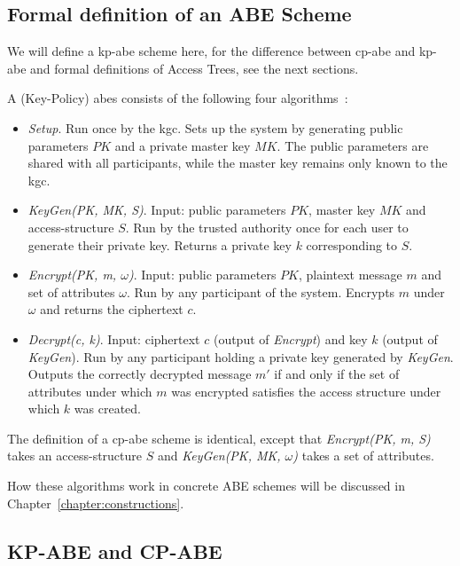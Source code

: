 \subsection{Formal definition of an ABE Scheme}\label{sec:definition-es}

We will define a \acrshort{kp-abe} scheme here, for the difference between \acrshort{cp-abe} and \acrshort{kp-abe} and formal definitions of Access Trees, see the next sections.

\begin{definition}
    A (Key-Policy) \Acrlong{abes} consists of the following four algorithms~\cite{goyal_attribute-based_2006}:
    \begin{itemize}
        \item \emph{Setup}. Run once by the \acrfull{kgc}. Sets up the system by generating public parameters $PK$ and a private master key $MK$. The public parameters are shared with all participants, while the master key remains only known to the \acrshort{kgc}.
        \item \emph{KeyGen(PK, MK, S)}. Input: public parameters $PK$, master key $MK$ and \gls{access-structure} $S$.
        Run by the trusted authority once for each user to generate their private key. Returns a private key $k$ corresponding to $S$.
        \item \emph{Encrypt(PK, m, $\omega$)}. Input: public parameters $PK$, plaintext message $m$ and set of attributes $\omega$.
        Run by any participant of the system. Encrypts $m$ under $\omega$ and returns the ciphertext $c$.
        \item \emph{Decrypt(c, k)}. Input: ciphertext $c$ (output of \emph{Encrypt}) and key $k$ (output of \emph{KeyGen}).
        Run by any participant holding a private key generated by \emph{KeyGen}. Outputs the correctly decrypted message $m'$ if and only if the set of attributes under which $m$ was encrypted satisfies the access structure under which $k$ was created.
    \end{itemize}
\end{definition}

The definition of a \acrshort{cp-abe} scheme is identical, except that \emph{Encrypt(PK, m, S)} takes an \gls{access-structure} $S$ and \emph{KeyGen(PK, MK, $\omega$)} takes a set of attributes.

How these algorithms work in concrete ABE schemes will be discussed in Chapter~\ref{chapter:constructions}.

\subsection{KP-ABE and CP-ABE}\label{sec:cp-vs-kp}



